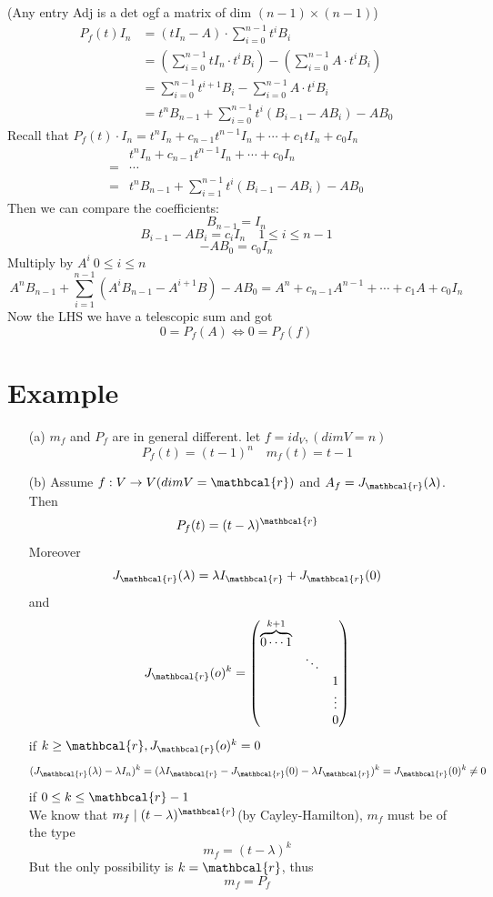 \documentclass{book}
\begin{document}
(Any entry Adj is a det ogf a matrix of dim $(n-1)\times(n-1)$)
$$
\begin{aligned}
    P_f(t)I_n &=(tI_n-A)\cdot\sum\limits_{i=0}^{n-1}t^iB_i\\
    &=(\sum\limits_{i=0}^{n-1}tI_n\cdot t^iB_i)-(\sum\limits_{i=0}^{n-1}A\cdot t^iB_i)\\
    &=\sum\limits_{i=0}^{n-1}t^{i+1}B_i-\sum\limits_{i=0}^{n-1}A\cdot t^iB_i\\
    &= t^nB_{n-1}+\sum\limits_{i=0}^{n-1}t^i(B_{i-1}-AB_i)-AB_0
\end{aligned}
$$Recall that $P_f(t)\cdot I_n=t^nI_n+ c_{n-1}t^{n-1}I_n+\cdots+c_1tI_n+c_0I_n$
$$
\begin{aligned}
    &t^nI_n+c_{n-1}t^{n-1}I_n+\cdots+c_0I_n\\=&\cdots\\=&t^nB_{n-1}+\sum\limits_{i=1}^{n-1}t^i(B_{i-1}-AB_i)-AB_0
\end{aligned}
$$
Then we can compare the coefficients:
$$B_{n-1}=I_n$$
$$B_{i-1}-AB_i=c_iI_n\quad 1\leq i\leq n-1$$
$$-AB_0=c_0I_n$$
Multiply by $A^i\ 0\leq i\leq n$
$$A^nB_{n-1}+\sum\limits_{i=1}^{n-1}(A^iB_{n-1}-A^{i+1}B)-AB_0=A^n+c_{n-1}A^{n-1}+\cdots+c_1A+c_0I_n$$
Now the LHS we have a telescopic sum and got
$$0=P_f(A) \Leftrightarrow 0=P_f(f)$$
\section{Example}
\begin{itemize}
    \item[(a)] $m_f$ and $P_f$ are in general different. let $f=id_V,(dim V=n)$
    $$P_f(t)=(t-1)^n\quad m_f(t)=t-1$$
    \item[(b)]Assume $f:V\rightarrow V(dim V=\mathbcal{r})$ and $A_f=J_\mathbcal{r}(\lambda)$. Then
    $$P_f(t)=(t-\lambda)^\mathbcal{r}$$
    Moreover $$J_\mathbcal{r}(\lambda)=\lambda I_\mathbcal{r}+J_\mathbcal{r}(0)$$ and $$J_\mathbcal{r}(o)^k=\begin{pmatrix}
        \overbrace{0\cdots 1}\limits^{k+1}&&\\&\ddots&\\ &&1\\&&\vdots\\&&0
    \end{pmatrix}$$ if $k\geq\mathbcal{r},J_\mathbcal{r}(o)^k=0$
    $$(J_\mathbcal{r}(\lambda)-\lambda I_n)^k=(\lambda I_\mathbcal{r}-J_\mathbcal{r}(0)-\lambda I_\mathbcal{r})^k=J_\mathbcal{r}(0)^k\neq 0$$ if $0\leq k\leq\mathbcal{r}-1$\\We know that $m_f\mid (t-\lambda)^\mathbcal{r}$(by Cayley-Hamilton), $m_f$ must be of the type $$m_f=(t-\lambda)^k$$
    But the only possibility is $k=\mathbcal{r}$, thus$$m_f=P_f$$
\end{itemize}
\end{document}
